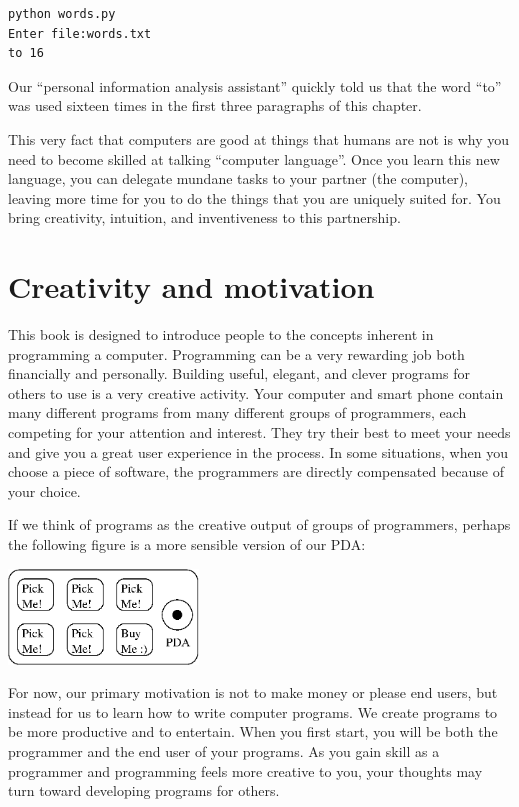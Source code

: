 \beforeverb
\begin{verbatim}
python words.py
Enter file:words.txt
to 16
\end{verbatim}
\afterverb
%
Our ``personal information analysis assistant'' quickly 
told us that the word ``to'' was used sixteen times in the
first three paragraphs of this chapter.

This very fact that computers are good at things 
that humans are not is why you need to become
skilled at talking ``computer language''.  Once you learn
this new language, you can delegate mundane tasks
to your partner (the computer), leaving more time 
for you to do the 
things that you are uniquely suited for.  You bring 
creativity, intuition, and inventiveness to this
partnership.

\section{Creativity and motivation}

This book is designed to introduce people to the concepts inherent in
programming a computer. Programming can be a very rewarding job both 
financially and personally.
Building useful, elegant, and clever programs for others to use is a very
creative activity.  Your computer and smart phone
contain many different programs from many different groups of 
programmers, each competing for your attention and interest.  They try 
their best to meet your needs and give you a great user experience in the
process.   In some situations, when you choose a piece of software, the 
programmers are directly compensated because of your choice.

If we think of programs as the creative output of groups of programmers,
perhaps the following figure is a more sensible version of our PDA:

\beforefig
\centerline{\includegraphics[height=1.00in]{figs2/pda2.eps}}
\afterfig

For now, our primary motivation is not to make money or please end users, but
instead for us to learn how to write computer programs. We create programs
to be more productive and to entertain.
When you first start, you will be both the programmer and the end user of
your programs.  As you gain skill as a programmer and
programming feels more creative to you, your thoughts may turn
toward developing programs for others.

